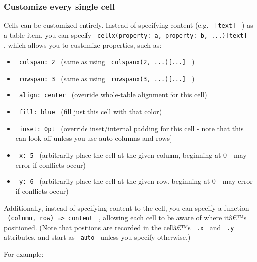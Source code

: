 
\subsubsection{Customize every single
cell}\label{customize-every-single-cell}

Cells can be customized entirely. Instead of specifying content (e.g.
\texttt{\ {[}text{]}\ } ) as a table item, you can specify
\texttt{\ cellx(property:\ a,\ property:\ b,\ ...){[}text{]}\ } , which
allows you to customize properties, such as:

\begin{itemize}
\tightlist
\item
  \texttt{\ colspan:\ 2\ } (same as using
  \texttt{\ colspanx(2,\ ...){[}...{]}\ } )
\item
  \texttt{\ rowspan:\ 3\ } (same as using
  \texttt{\ rowspanx(3,\ ...){[}...{]}\ } )
\item
  \texttt{\ align:\ center\ } (override whole-table alignment for this
  cell)
\item
  \texttt{\ fill:\ blue\ } (fill just this cell with that color)
\item
  \texttt{\ inset:\ 0pt\ } (override inset/internal padding for this
  cell - note that this can look off unless you use auto columns and
  rows)
\item
  \texttt{\ x:\ 5\ } (arbitrarily place the cell at the given column,
  beginning at 0 - may error if conflicts occur)
\item
  \texttt{\ y:\ 6\ } (arbitrarily place the cell at the given row,
  beginning at 0 - may error if conflicts occur)
\end{itemize}

Additionally, instead of specifying content to the cell, you can specify
a function \texttt{\ (column,\ row)\ =\textgreater{}\ content\ } ,
allowing each cell to be aware of where itâ€™s positioned. (Note that
positions are recorded in the cellâ€™s \texttt{\ .x\ } and
\texttt{\ .y\ } attributes, and start as \texttt{\ auto\ } unless you
specify otherwise.)

For example:

\begin{Shaded}
\begin{Highlighting}[]

\NormalTok{  [f], (),             [g],}

\NormalTok{)}
\end{Highlighting}
\end{Shaded}

